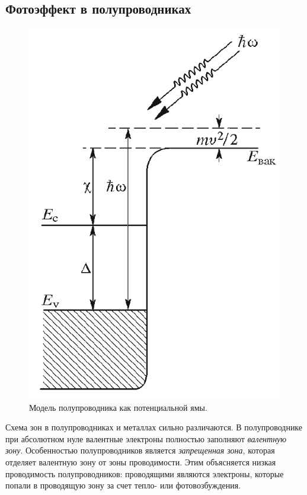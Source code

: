 \documentclass[12pt,a4paper]{article}
\begin{document}
	\subsection*{Фотоэффект в полупроводниках}
	
					  
	\begin{figure}
		\includegraphics[scale=0.6]{res/semiconductor.png}
		\caption{Модель полупроводника как потенциальной ямы.}
		\label{fig:semiconductor}
		\vspace{0pt}
	\end{figure}
	
	Схема зон в полупроводниках и металлах сильно различаются. В полупроводнике при абсолютном нуле валентные электроны полностью заполняют \textit{валентную зону}. Особенностью полупроводников является \textit{запрещенная зона}, которая отделяет валентную зону от зоны проводимости. Этим объясняется низкая проводимость полупроводников: проводящими являются электроны, которые попали в проводящую зону за счет тепло- или фотовозбуждения.
	
\end{document}
